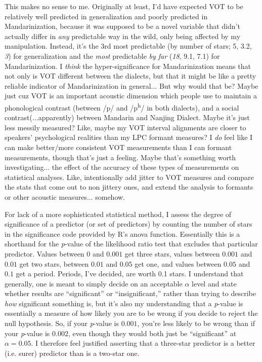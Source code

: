 This makes no sense to me. Originally at least, I'd have expected VOT to be relatively well predicted in generalization and poorly predicted in Mandarinization, because it was supposed to be a novel variable that didn't actually differ in \emph{any} predictable way in the wild, only being affected by my manipulation. Instead, it's the 3rd most predictable (by number of stars; 5, 3.2, \emph{3}) for generalization and the \emph{most} predictable \emph{by far} (\emph{18}, 9.1, 7.1) for Mandarinization. I \emph{think} the hyper-significance for Mandarinization means that not only is VOT different between the dialects, but that it might be like a pretty reliable indicator of Mandarinization in general... But why would that be? Maybe just cuz VOT is an important acoustic dimension which people use to maintain a phonological contrast (between /p/ and /p\textsuperscript{h}/ in both dialects), and a social contrast(...apparently) between Mandarin and Nanjing Dialect. Maybe it's just less messily measured? Like, maybe my VOT interval alignments are closer to speakers' psychological realities than my LPC formant measures? I \emph{do} feel like I can make better\slash more consistent VOT measurements than I can formant measurements, though that's just a feeling. Maybe that's something worth investigating... the effect of the accuracy of these types of measurements on statistical analyses. Like, intentionally add jitter to VOT measures and compare the stats that come out to non jittery ones, and extend the analysis to formants or other acoustic measures... somehow.

For lack of a more sophisticated statistical method, I assess the degree of significance of a predictor (or set of predictors) by counting the number of stars in the significance code provided by R's \citep{r2013r} anova function. Essentially this is a shorthand for the \textit{p}-value of the likelihood ratio test that excludes that particular predictor. Values between $0$ and $0.001$ get three stars, values between $0.001$ and $0.01$ get two stars, between $0.01$ and $0.05$ get one, and values between $0.05$ and $0.1$ get a period. Periods, I've decided, are worth 0.1 stars. I understand that generally, one is meant to simply decide on an acceptable $\alpha$ level and state whether results are ``significant'' or ``insignificant,'' rather than trying to describe \emph{how} significant something is, but it's also my understanding that a \textit{p}-value is essentially a measure of how likely you are to be wrong if you decide to reject the null hypothesis. So, if your \textit{p}-value is $0.001$, you're less likely to be wrong than if your \textit{p}-value is $0.002$, even though they would both just be ``significant'' at $\alpha = 0.05$. I therefore feel justified asserting that a three-star predictor is a better (i.e. surer) predictor than is a two-star one.


